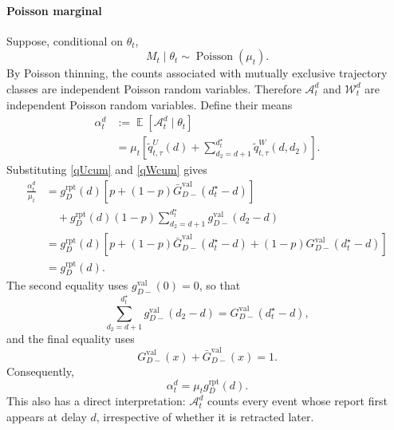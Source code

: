 \documentclass{article}
\theoremstyle{definition}
\theoremstyle{remark}
\newcommand{\Pois}{\operatorname{Poisson}}
\newcommand{\E}{\operatorname{\mathbb{E}}}
\begin{document}
\paragraph{Poisson marginal}
Suppose, conditional on $\theta_t$,
\begin{equation}
    M_t\mid\theta_t\sim\Pois(\mu_t).
\end{equation}
By Poisson thinning, the counts associated with mutually exclusive trajectory classes are independent Poisson random variables. Therefore $\mathcal A_t^d$ and $\mathcal W_t^d$ are independent Poisson random variables. Define their means
\begin{equation}\label{alphadef}
\begin{split}
    \alpha_t^d
    &:={}
    \E[\mathcal A_t^d\mid\theta_t]\\
    &=
    \mu_t\left[
    \tilde q_{t,\tau}^{U}(d)
    +
    \sum_{d_2=d+1}^{d_t^{\star}}
    \tilde q_{t,\tau}^{W}(d,d_2)
    \right].
\end{split}
\end{equation}
Substituting \eqref{qUcum} and \eqref{qWcum} gives
\begin{equation}\label{alphasteps}
\begin{split}
\frac{\alpha_t^d}{\mu_t}
&=
 g_D^{\mathrm{rpt}}(d)
\left[
 p+(1-p)\bar G_{D-}^{\mathrm{val}}(d_t^{\star}-d)
\right]\\
&\quad+
 g_D^{\mathrm{rpt}}(d)(1-p)
 \sum_{d_2=d+1}^{d_t^{\star}}
 g_{D-}^{\mathrm{val}}(d_2-d)\\
&=
 g_D^{\mathrm{rpt}}(d)
\left[
 p+(1-p)\bar G_{D-}^{\mathrm{val}}(d_t^{\star}-d)
 +(1-p)G_{D-}^{\mathrm{val}}(d_t^{\star}-d)
\right]\\
&=
 g_D^{\mathrm{rpt}}(d).
\end{split}
\end{equation}
The second equality uses $g_{D-}^{\mathrm{val}}(0)=0$, so that
\begin{equation}
\sum_{d_2=d+1}^{d_t^{\star}}g_{D-}^{\mathrm{val}}(d_2-d)
=
G_{D-}^{\mathrm{val}}(d_t^{\star}-d),
\end{equation}
and the final equality uses
\begin{equation}
    G_{D-}^{\mathrm{val}}(x)+\bar G_{D-}^{\mathrm{val}}(x)=1.
\end{equation}
Consequently,
\begin{equation}\label{alphasimplified}
    \alpha_t^d=\mu_t g_D^{\mathrm{rpt}}(d).
\end{equation}
This also has a direct interpretation: $\mathcal A_t^d$ counts every event whose report first appears at delay $d$, irrespective of whether it is retracted later.
\end{document}
